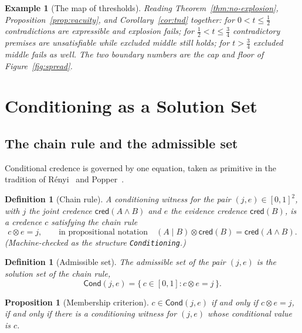 \documentclass[11pt,a4paper]{article}
\newtheorem{proposition}[theorem]{Proposition}
\newtheorem{definition}[theorem]{Definition}
\newtheorem{example}[theorem]{Example}
\newcommand{\cred}{\mathsf{cred}}
\newcommand{\conjc}{\otimes}
\newcommand{\condc}[2]{({#1} \mid {#2})}
\newcommand{\Cond}{\mathsf{Cond}}
\begin{document}
\begin{example}[The map of thresholds]
\label{ex:thresholds}
Reading Theorem~\ref{thm:no-explosion},
Proposition~\ref{prop:vacuity}, and Corollary~\ref{cor:tnd} together:
for $0 < t \leq \tfrac{1}{2}$ contradictions are expressible and
explosion fails; for $\tfrac{1}{2} < t \leq \tfrac{3}{4}$
contradictory premises are unsatisfiable while excluded middle still
holds; for $t > \tfrac{3}{4}$ excluded middle fails as well.
The two boundary numbers are the cap and floor of
Figure~\ref{fig:spread}.
\end{example}

\section{Conditioning as a Solution Set}
\label{sec:conditioning}

\subsection{The chain rule and the admissible set}

Conditional credence is governed by one equation, taken as primitive
in the tradition of R\'enyi~\cite{renyi1955} and
Popper~\cite{popper1959}.

\begin{definition}[Chain rule]
\label{def:chain}
A \emph{conditioning witness} for the pair
$(j, e) \in [0,1]^2$, with $j$ the \emph{joint} credence
$\cred(A \land B)$ and $e$ the \emph{evidence} credence $\cred(B)$,
is a credence $c$ satisfying the \emph{chain rule}
\[
c \conjc e = j,
\qquad\text{in propositional notation}\quad
\condc{A}{B} \conjc \cred(B) = \cred(A \land B).
\]
(Machine-checked as the structure \texttt{Conditioning}.)
\end{definition}

\begin{definition}[Admissible set]
\label{def:cond}
The \emph{admissible set} of the pair $(j,e)$ is the solution set of
the chain rule,
\[
\Cond(j, e) = \{\, c \in [0,1] : c \conjc e = j \,\}.
\]
\end{definition}

\begin{proposition}[Membership criterion]
\label{prop:mem}
$c \in \Cond(j,e)$ if and only if $c \conjc e = j$, if and only if
there is a conditioning witness for $(j,e)$ whose conditional value
is $c$.
\end{proposition}
\end{document}
